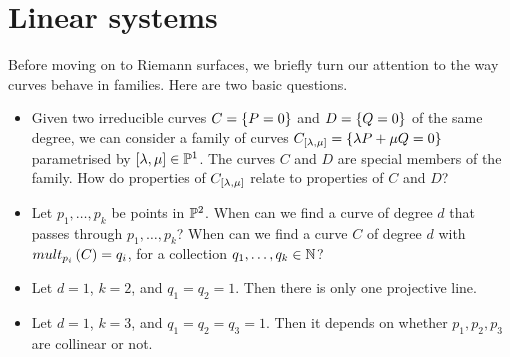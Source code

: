 \pagebreak

\section{Linear systems}

Before moving on to Riemann surfaces, we briefly turn our attention to the way curves behave in families. Here are two basic questions.
\begin{itemize}
\item Given two irreducible curves $ C = \cbr{P = 0} $ and $ D = \cbr{Q = 0} $ of the same degree, we can consider a family of curves $ C_{\sbr{\lambda, \mu}} = \cbr{\lambda P + \mu Q = 0} $ parametrised by $ \sbr{\lambda, \mu} \in \P^1 $. The curves $ C $ and $ D $ are special members of the family. How do properties of $ C_{\sbr{\lambda, \mu}} $ relate to properties of $ C $ and $ D $?
\item Let $ p_1, \dots, p_k $ be points in $ \P^2 $. When can we find a curve of degree $ d $ that passes through $ p_1, \dots, p_k $? When can we find a curve $ C $ of degree $ d $ with $ mult_{p_i}\br{C} = q_i $, for a collection $ q_1, \dots, q_k \in \N $?
\end{itemize}

\begin{example*}
\hfill
\begin{itemize}
\item Let $ d = 1 $, $ k = 2 $, and $ q_1 = q_2 = 1 $. Then there is only one projective line.
\item Let $ d = 1 $, $ k = 3 $, and $ q_1 = q_2 = q_3 = 1 $. Then it depends on whether $ p_1, p_2, p_3 $ are collinear or not.
\end{itemize}
\end{example*}

